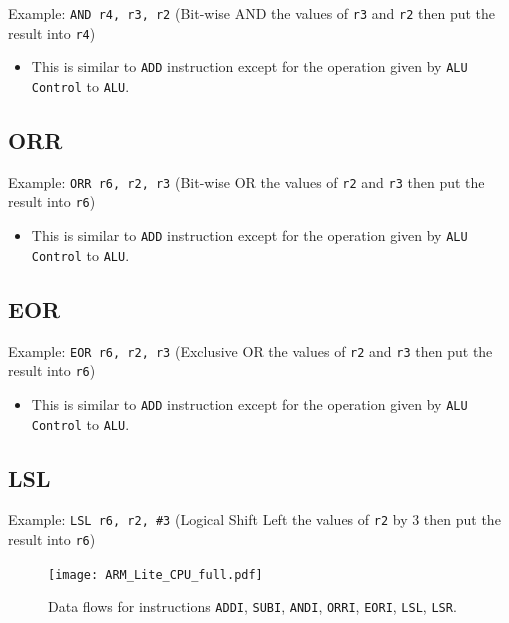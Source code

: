 \documentclass[11pt,fancy,bibstyle=ieee]{elegantbook}
\begin{document}
      Example: \texttt{AND r4, r3, r2} (Bit-wise AND the values of \texttt{r3} and \texttt{r2} then put the result into \texttt{r4})

      \begin{itemize}
        \item This is similar to \texttt{ADD} instruction except for the operation given by \texttt{ALU Control} to \texttt{ALU}.
      \end{itemize}

    \subsection{ORR}
      Example: \texttt{ORR r6, r2, r3} (Bit-wise OR the values of \texttt{r2} and \texttt{r3} then put the result into \texttt{r6})

      \begin{itemize}
        \item This is similar to \texttt{ADD} instruction except for the operation given by \texttt{ALU Control} to \texttt{ALU}.
      \end{itemize}

    \subsection{EOR}
      Example: \texttt{EOR r6, r2, r3} (Exclusive OR the values of \texttt{r2} and \texttt{r3} then put the result into \texttt{r6})

      \begin{itemize}
        \item This is similar to \texttt{ADD} instruction except for the operation given by \texttt{ALU Control} to \texttt{ALU}.
      \end{itemize}
    \subsection{LSL}

      Example: \texttt{LSL r6, r2, \#3} (Logical Shift Left the values of \texttt{r2} by 3 then put the result into \texttt{r6})

      \begin{figure}[htbp]
        \centering
        \texttt{[image: ARM\_Lite\_CPU\_full.pdf]}
        \caption{Data flows for instructions \texttt{ADDI}, \texttt{SUBI}, \texttt{ANDI}, \texttt{ORRI}, \texttt{EORI}, \texttt{LSL}, \texttt{LSR}.}
        \label{fig:CPU_p5}
      \end{figure}
\end{document}
